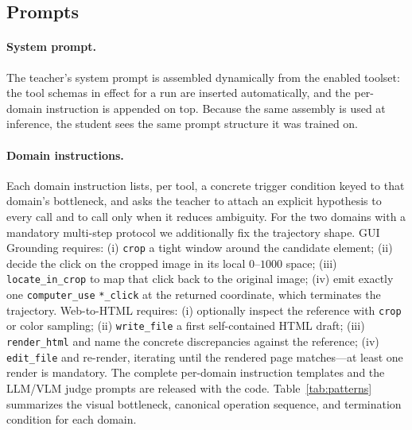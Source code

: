 \subsection{Prompts}
\label{app:prompts}

\paragraph{System prompt.}
The teacher's system prompt is assembled dynamically from the enabled toolset: the tool schemas in effect for a run are inserted automatically, and the per-domain instruction is appended on top. Because the same assembly is used at inference, the student sees the same prompt structure it was trained on.

\paragraph{Domain instructions.}
Each domain instruction lists, per tool, a concrete trigger condition keyed to that domain's bottleneck, and asks the teacher to attach an explicit hypothesis to every call and to call only when it reduces ambiguity. For the two domains with a mandatory multi-step protocol we additionally fix the trajectory shape. GUI Grounding requires: (i) \texttt{crop} a tight window around the candidate element; (ii) decide the click on the cropped image in its local $0$--$1000$ space; (iii) \texttt{locate\_in\_crop} to map that click back to the original image; (iv) emit exactly one \texttt{computer\_use} \texttt{*\_click} at the returned coordinate, which terminates the trajectory. Web-to-HTML requires: (i) optionally inspect the reference with \texttt{crop} or color sampling; (ii) \texttt{write\_file} a first self-contained HTML draft; (iii) \texttt{render\_html} and name the concrete discrepancies against the reference; (iv) \texttt{edit\_file} and re-render, iterating until the rendered page matches---at least one render is mandatory. The complete per-domain instruction templates and the LLM/VLM judge prompts are released with the code. Table~\ref{tab:patterns} summarizes the visual bottleneck, canonical operation sequence, and termination condition for each domain. 

